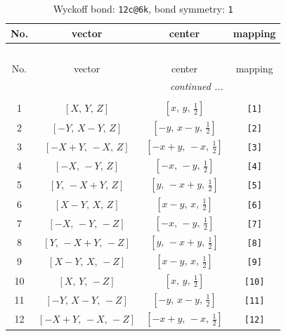 \documentclass[fleqn,8pt]{jsarticle}
\begin{document}
\begin{longtable}{cccc}
\caption{Wyckoff bond: {\tt 12c@6k}, bond symmetry: {\tt 1}}
 \\
 \hline \hline
No. & vector & center & mapping \\ \hline \endfirsthead

\multicolumn{3}{l}{\tablename\ \thetable{}} \\
 \hline \hline
No. & vector & center & mapping \\ \hline \endhead

 \hline \hline
\multicolumn{3}{r}{\footnotesize\it continued ...} \\ \endfoot

 \hline \hline
\multicolumn{3}{r}{} \\ \endlastfoot

1 & $\left[ X,\, Y,\, Z \right]$ & $\left[ x,\, y,\, \frac{1}{2} \right]$ & {\tt [1]} \\ \hline
2 & $\left[ - Y,\, X - Y,\, Z \right]$ & $\left[ - y,\, x - y,\, \frac{1}{2} \right]$ & {\tt [2]} \\ \hline
3 & $\left[ - X + Y,\, - X,\, Z \right]$ & $\left[ - x + y,\, - x,\, \frac{1}{2} \right]$ & {\tt [3]} \\ \hline
4 & $\left[ - X,\, - Y,\, Z \right]$ & $\left[ - x,\, - y,\, \frac{1}{2} \right]$ & {\tt [4]} \\ \hline
5 & $\left[ Y,\, - X + Y,\, Z \right]$ & $\left[ y,\, - x + y,\, \frac{1}{2} \right]$ & {\tt [5]} \\ \hline
6 & $\left[ X - Y,\, X,\, Z \right]$ & $\left[ x - y,\, x,\, \frac{1}{2} \right]$ & {\tt [6]} \\ \hline
7 & $\left[ - X,\, - Y,\, - Z \right]$ & $\left[ - x,\, - y,\, \frac{1}{2} \right]$ & {\tt [7]} \\ \hline
8 & $\left[ Y,\, - X + Y,\, - Z \right]$ & $\left[ y,\, - x + y,\, \frac{1}{2} \right]$ & {\tt [8]} \\ \hline
9 & $\left[ X - Y,\, X,\, - Z \right]$ & $\left[ x - y,\, x,\, \frac{1}{2} \right]$ & {\tt [9]} \\ \hline
10 & $\left[ X,\, Y,\, - Z \right]$ & $\left[ x,\, y,\, \frac{1}{2} \right]$ & {\tt [10]} \\ \hline
11 & $\left[ - Y,\, X - Y,\, - Z \right]$ & $\left[ - y,\, x - y,\, \frac{1}{2} \right]$ & {\tt [11]} \\ \hline
12 & $\left[ - X + Y,\, - X,\, - Z \right]$ & $\left[ - x + y,\, - x,\, \frac{1}{2} \right]$ & {\tt [12]} \\
\end{longtable}
\end{document}
